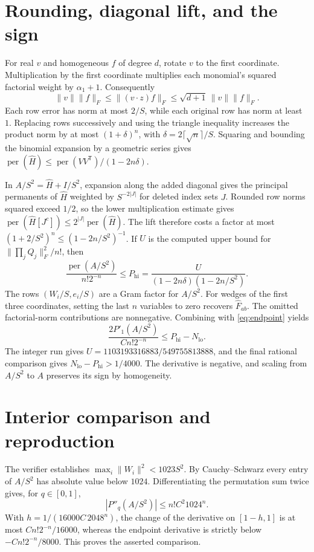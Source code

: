 \documentclass[10pt]{article}
\DeclareMathOperator{\perma}{per}
\begin{document}
\newpage
\section{Rounding, diagonal lift, and the sign}

For real $v$ and homogeneous $f$ of degree $d$, rotate $v$ to the first
coordinate. Multiplication by the first coordinate multiplies each
monomial's squared factorial weight by $\alpha_1+1$. Consequently
\[
 \|v\|\|f\|_F\le\|(v\cdot z)f\|_F
 \le\sqrt{d+1}\,\|v\|\|f\|_F .
\]
Each row error has norm at most $2/S$, while each original row has norm
at least $1$. Replacing rows successively and using the triangle
inequality increases the product norm by at most $(1+\delta)^n$, with
$\delta=2\lceil\sqrt n\rceil/S$. Squaring and bounding the binomial
expansion by a geometric series gives
$\perma(\widehat H)\le\perma(VV^{\mathsf T})/(1-2n\delta)$.

In $A/S^2=\widehat H+I/S^2$, expansion along the added diagonal gives
the principal permanents of $\widehat H$ weighted by $S^{-2|J|}$ for
deleted index sets $J$. Rounded row norms squared exceed $1/2$, so the
lower multiplication estimate gives
$\perma(\widehat H[J^c])\le2^{|J|}\perma(\widehat H)$. The lift
therefore costs a factor at most $(1+2/S^2)^n\le (1-2n/S^2)^{-1}$.
If $U$ is the computed upper bound for $\|\prod_j Q_j\|_F^2/n!$, then
\[
 \frac{\perma(A/S^2)}{n!2^{-n}}
 \le P_{\mathrm{hi}}=\frac{U}{(1-2n\delta)(1-2n/S^2)}.
\]
The rows $(W_i/S,e_i/S)$ are a Gram factor for $A/S^2$. For wedges of
the first three coordinates, setting the last $n$ variables to zero
recovers $\widehat F_{ab}$. The omitted factorial-norm contributions
are nonnegative. Combining with \eqref{eq:endpoint} yields
\[
 \frac{2P'_1(A/S^2)}{Cn!2^{-n}}\le P_{\mathrm{hi}}-N_{\mathrm{lo}}.
\]
The integer run gives $U=1103193316883/549755813888$, and the final
rational comparison gives $N_{\mathrm{lo}}-P_{\mathrm{hi}}>1/4000$.
The derivative is negative, and scaling from $A/S^2$ to $A$ preserves
its sign by homogeneity.

\section{Interior comparison and reproduction}

The verifier establishes $\max_i\|W_i\|^2<1023 S^2$. By Cauchy--Schwarz
every entry of $A/S^2$ has absolute value below $1024$. Differentiating
the permutation sum twice gives, for $q\in[0,1]$,
\[
 |P''_q(A/S^2)|\le n!C^2 1024^n .
\]
With $h=1/(16000C\,2048^n)$, the change of the derivative on $[1-h,1]$
is at most $Cn!2^{-n}/16000$, whereas the endpoint derivative is
strictly below $-Cn!2^{-n}/8000$. This proves the asserted comparison.
\end{document}
